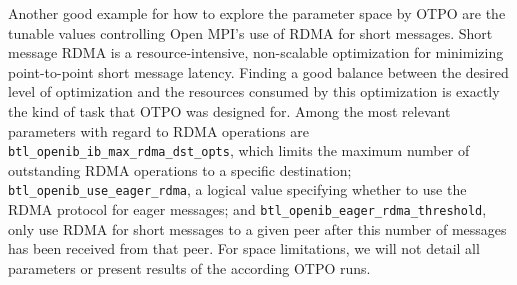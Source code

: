 Another good example for how to explore the parameter space by OTPO are the tunable values
controlling Open MPI's use of RDMA for short messages.  Short message
RDMA is a resource-intensive, non-scalable optimization for minimizing
point-to-point short message latency.  Finding a good balance between
the desired level of optimization and the resources consumed by this
optimization is exactly the kind of task that OTPO was designed for. Among the most relevant parameters with regard to RDMA operations are {\tt btl\_\-openib\_\-ib\_\-max\_\-rdma\_\-dst\_\-opts}, which limits the maximum number of outstanding RDMA operations to a specific destination; {\tt btl\_\-openib\_\-use\_\-eager\_\-rdma}, a logical value specifying whether to use the RDMA protocol for eager messages; and {\tt btl\_\-openib\_\-eager\_\-rdma\_\-threshold}, only use RDMA for short messages to a given peer after this number of messages has been received from that peer. For space limitations, we will not detail all parameters or present results of the according OTPO runs.

